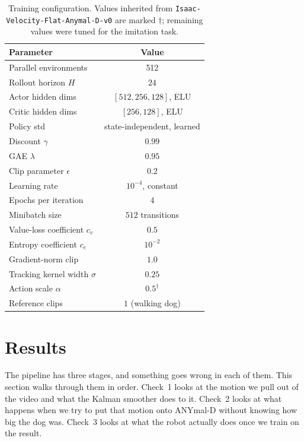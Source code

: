 \documentclass{article}
\theoremstyle{plain}
\theoremstyle{definition}
\theoremstyle{remark}
\begin{document}
\begin{table}[t]
\caption{Training configuration. Values inherited from
\texttt{Isaac-Velocity-Flat-Anymal-D-v0} are marked $\dagger$; remaining values
were tuned for the imitation task.}
\label{tab:hparams}
\vskip 0.1in
\centering
\small
\begin{tabular}{lc}
\toprule
Parameter & Value \\
\midrule
Parallel environments                  & 512 \\
Rollout horizon $H$                    & $24$ \\
Actor hidden dims                      & $[512,256,128]$, ELU \\
Critic hidden dims                     & $[256,128]$, ELU \\
Policy std                             & state-independent, learned \\
Discount $\gamma$                      & $0.99$ \\
GAE $\lambda$                          & $0.95$ \\
Clip parameter $\epsilon$              & $0.2$ \\
Learning rate                          & $10^{-4}$, constant \\
Epochs per iteration                   & $4$ \\
Minibatch size                         & $512$ transitions \\
Value-loss coefficient $c_v$           & $0.5$ \\
Entropy coefficient $c_e$              & $10^{-2}$ \\
Gradient-norm clip                     & $1.0$ \\
Tracking kernel width $\sigma$         & $0.25$ \\
Action scale $\alpha$                  & $0.5^{\dagger}$ \\
Reference clips                        & $1$ (walking dog)
\bottomrule
\end{tabular}
\vskip -0.1in
\end{table}


\section{Results}
\label{sec:results}
 
The pipeline has three stages, and something goes wrong in each of them. This
section walks through them in order. Check~1 looks at the motion we pull out
of the video and what the Kalman smoother does to it. Check~2 looks at what
happens when we try to put that motion onto ANYmal-D without knowing how big
the dog was. Check~3 looks at what the robot actually does once we train on
the result.
 
\end{document}
